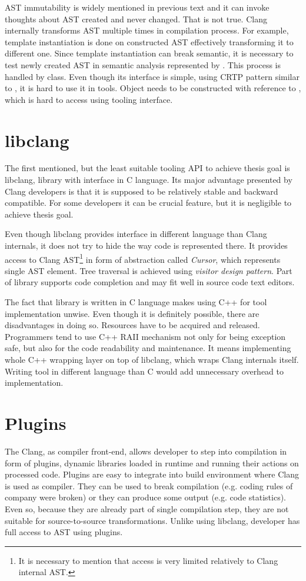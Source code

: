 AST immutability is widely mentioned in previous text and it can invoke thoughts about AST created and never changed. That is not true. Clang internally transforms AST multiple times in compilation process. For example, template instantiation is done on constructed AST effectively transforming it to different one. Since template instantiation can break semantic, it is necessary to test newly created AST in semantic analysis represented by . This process is handled by  class. Even though its interface is simple, using CRTP pattern similar to , it is hard to use it in tools. Object needs to be constructed with reference to , which is hard to access using tooling interface. 

\section{libclang}
The first mentioned, but the least suitable tooling API to achieve thesis goal is libclang, library with interface in C language. Its major advantage presented by Clang developers is that it is supposed to be relatively stable and backward compatible. For some developers it can be crucial feature, but it is negligible to achieve thesis goal.

Even though libclang provides interface in different language than Clang internals, it does not try to hide the way code is represented there. It provides access to Clang AST\footnote{It is necessary to mention that access is very limited relatively to Clang internal AST.} in form of abstraction called \emph{Cursor}, which represents single AST element. Tree traversal is achieved using \emph{visitor design pattern}. Part of library supports code completion and may fit well in source code text editors.

The fact that library is written in C language makes using C++ for tool implementation unwise. Even though it is definitely possible, there are disadvantages in doing so. Resources have to be acquired and released. Programmers tend to use C++ RAII mechanism not only for being exception safe, but also for the code readability and maintenance. It means implementing whole C++ wrapping layer on top of libclang, which wraps Clang internals itself. Writing tool in different language than C would add unnecessary overhead to implementation. 

\section{Plugins}
The Clang, as compiler front-end, allows developer to step into compilation in form of plugins, dynamic libraries loaded in runtime and running their actions on processed code. Plugins are easy to integrate into build environment where Clang is used as compiler. They can be used to break compilation (e.g.  coding rules of company were broken) or they can produce some output (e.g. code statistics). Even so, because they are already part of single compilation step, they are not suitable for source-to-source transformations. Unlike using libclang, developer has full access to AST using plugins.

